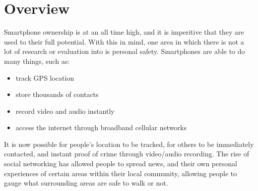 \documentclass[a4paper]{report}
\begin{document}
\section{Overview}
\label{sec:Overview}
  Smartphone ownership is at an all time high, and it is imperitive that they are used to their full potential. With this in mind, one area in which there is not a lot of research or evaluation into is personal safety. Smartphones are able to do many things, such as:
\begin{itemize}
    \item track GPS location
    \item store thousands of contacts
    \item record video and audio instantly
    \item access the internet through broadband cellular networks
  \end{itemize}
 It is now possible for people's location to be tracked, for others to be immediately contacted, and instant proof of crime
  through video/audio recording. The rise of social networking has allowed people to spread news, and their own personal experiences of certain areas within their local community,
  allowing people to gauge what surrounding areas are safe to walk or not.
\end{document}
